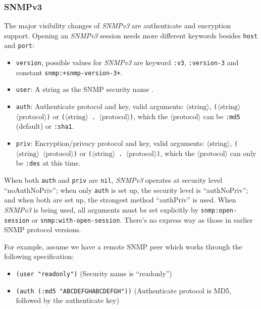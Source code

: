 \documentclass[reprint,9pt]{sigplanconf}
\begin{document}
\subsubsection{SNMPv3}

The major visibility changes of \textsl{SNMPv3} \cite{RFC:3411} are authenticate
and encryption support.
Opening an \textsl{SNMPv3} session needs more different keywords
besides \texttt{host} and \texttt{port}:

\begin{itemize}
\item \texttt{version}, possible values for \textsl{SNMPv3} are
  keyword \texttt{:v3}, \texttt{:version-3} and constant
  \texttt{snmp:+snmp-version-3+}.

\item \texttt{user}: A string as the SNMP security name \cite{RFC:3414}.

\item \texttt{auth}: Authenticate protocol and key, valid arguments:
  $\langle\mathrm{string}\rangle$,
  \texttt{($\langle\mathrm{string}\rangle$
    $\langle\mathrm{protocol}\rangle$)} or
  \texttt{($\langle\mathrm{string}\rangle$
    . $\langle\mathrm{protocol}\rangle$)}, which the
  \texttt{$\langle\mathrm{protocol}\rangle$} can be \texttt{:md5}
  (default) or \texttt{:sha1}.

\item \texttt{priv}: Encryption/privacy protocol and key, valid
  arguments: $\langle\mathrm{string}\rangle$,
  \texttt{($\langle\mathrm{string}\rangle$
    $\langle\mathrm{protocol}\rangle$)} or
  \texttt{($\langle\mathrm{string}\rangle$
    . $\langle\mathrm{protocol}\rangle$)}, which the
  \texttt{$\langle\mathrm{protocol}\rangle$} can only be \texttt{:des}
  at this time.
\end{itemize}

When both \texttt{auth} and \texttt{priv} are \texttt{nil},
\textsl{SNMPv3} operates at security level ``noAuthNoPriv''; when only
\texttt{auth} is set up, the security level is ``authNoPriv''; and
when both are set up, the strongest method ``authPriv'' is used. When
\textsl{SNMPv3} is being used, all arguments must be set explicitly by
\texttt{snmp:open-session} or \texttt{snmp:with-open-session}. There's
no express way as those in earlier SNMP protocol versions.

For example, assume we have a remote SNMP peer which works through the
following specification:
%
\begin{itemize}
\item \texttt{(user "readonly")} (Security name is ``readonly'')
\item \texttt{(auth (:md5 "ABCDEFGHABCDEFGH"))} (Authenticate protocol
  is MD5, followed by the authenticate key)
\end{itemize}
\end{document}
